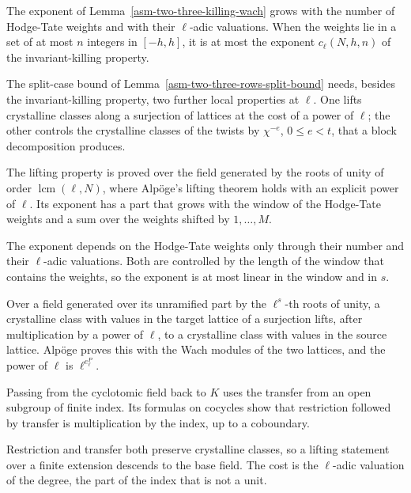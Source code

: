 The exponent of Lemma~\ref{asm-two-three-killing-wach} grows with the number
of Hodge-Tate weights and with their $\ell$-adic valuations. When the weights
lie in a set of at most $n$ integers in $[-h,h]$, it is at most the exponent
$c_\ell(N,h,n)$ of the invariant-killing property.

The split-case bound of Lemma~\ref{asm-two-three-rows-split-bound} needs, besides
the invariant-killing property, two further local properties at $\ell$. One
lifts crystalline classes along a surjection of lattices at the cost of a power
of $\ell$; the other controls the crystalline classes of the twists by
$\chi^{-e}$, $0\le e<t$, that a block decomposition produces.

The lifting property is proved over the field generated by the roots of unity of
order $\operatorname{lcm}(\ell,N)$, where Alpöge's lifting theorem holds with an
explicit power of $\ell$. Its exponent has a part that grows with the window of
the Hodge-Tate weights and a sum over the weights shifted by $1,\ldots,M$.

The exponent depends on the Hodge-Tate weights only through their number and
their $\ell$-adic valuations. Both are controlled by the length of the window
that contains the weights, so the exponent is at most linear in the window and
in $s$.

Over a field generated over its unramified part by the $\ell^s$-th roots of
unity, a crystalline class with values in the target lattice of a surjection
lifts, after multiplication by a power of $\ell$, to a crystalline class with
values in the source lattice. Alpöge proves this with the Wach modules of the two
lattices, and the power of $\ell$ is $\ell^{e^P_\ell}$.

Passing from the cyclotomic field back to $K$ uses the transfer from an open
subgroup of finite index. Its formulas on cocycles show that restriction
followed by transfer is multiplication by the index, up to a coboundary.

Restriction and transfer both preserve crystalline classes, so a lifting
statement over a finite extension descends to the base field. The cost is the
$\ell$-adic valuation of the degree, the part of the index that is not a unit.

